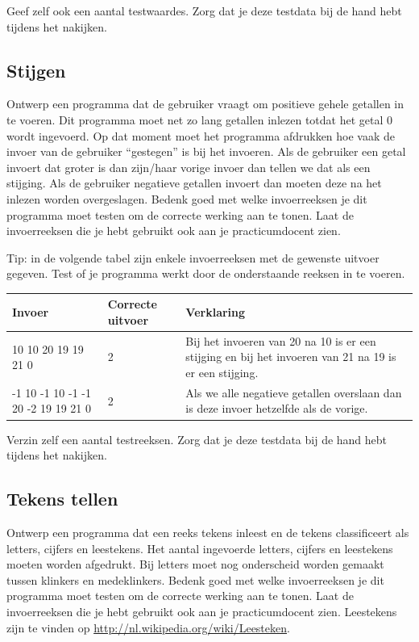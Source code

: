 \documentclass[a4paper,10pt,fleqn,twoside]{article}
\begin{document}
Geef zelf ook een aantal testwaardes. Zorg dat je deze testdata bij de hand hebt tijdens het nakijken.

\subsection{Stijgen}
Ontwerp een programma dat de gebruiker vraagt om positieve gehele getallen in te voeren. Dit programma moet net zo lang getallen inlezen totdat het getal 0 wordt ingevoerd. Op dat moment moet het programma afdrukken hoe vaak de invoer van de gebruiker ``gestegen'' is bij het invoeren. Als de gebruiker een getal invoert dat groter is dan zijn/haar vorige invoer dan tellen we dat als een stijging. Als de gebruiker negatieve getallen invoert dan moeten deze na het inlezen worden overgeslagen. Bedenk goed met welke invoerreeksen je dit programma moet testen om de correcte werking aan te tonen. Laat de invoerreeksen die je hebt gebruikt ook aan je practicumdocent zien.

Tip: in de volgende tabel zijn enkele invoerreeksen met de gewenste uitvoer gegeven. Test of je programma werkt door de onderstaande reeksen in te voeren.

\begin{table}[!ht]
\begin{tabular}{|l|p{1.5cm}|p{7.5cm}|}
\hline
Invoer                             & Correcte uitvoer & Verklaring \\ \hline
10 10 20 19 19 21 0                & 2                & Bij het invoeren van 20 na 10 is er een stijging en bij het invoeren van 21 na 19 is er een stijging. \\ \hline
-1 10 -1 10 -1 -1 20 -2 19 19 21 0 & 2                & Als we alle negatieve getallen overslaan dan is deze invoer hetzelfde als de vorige. \\ \hline                                                          
\end{tabular}
\end{table}

Verzin zelf een aantal testreeksen. Zorg dat je deze testdata bij de hand hebt tijdens het nakijken.

\subsection{Tekens tellen}
Ontwerp een programma dat een reeks tekens inleest en de tekens classificeert als letters, cijfers en leestekens. Het aantal ingevoerde letters, cijfers en leestekens moeten worden afgedrukt. Bij letters moet nog onderscheid worden gemaakt tussen klinkers en medeklinkers. Bedenk goed met welke invoerreeksen je dit programma moet testen om de correcte werking aan te tonen. Laat de invoerreeksen die je hebt gebruikt ook aan je practicumdocent zien. Leestekens zijn te vinden op \url{http://nl.wikipedia.org/wiki/Leesteken}.
\end{document}
